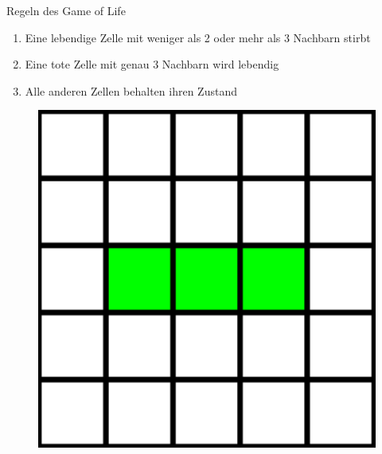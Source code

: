 \documentclass[aspectratio=169]{beamer}
\begin{document}
  \begin{frame}{Regeln des Game of Life}

    \begin{enumerate}
      \item Eine lebendige Zelle mit weniger als 2 oder mehr als 3 Nachbarn stirbt %
      \item Eine tote Zelle mit genau 3 Nachbarn wird lebendig %
      \item Alle anderen Zellen behalten ihren Zustand
    \end{enumerate}

    \pause

    \begin{multicols*}{3}

      \begin{figure}[H]
          \centering
          \includegraphics[height = 0.3 \textheight]{start_oscillator.png}
      \end{figure}

      \pause


\end{multicols*}
\end{frame}
\end{document}
